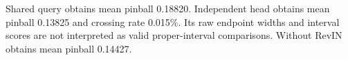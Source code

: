 Shared query obtains mean pinball 0.18820. Independent head obtains mean pinball 0.13825 and crossing rate 0.015\%. Its raw endpoint widths and interval scores are not interpreted as valid proper-interval comparisons. Without RevIN obtains mean pinball 0.14427.
